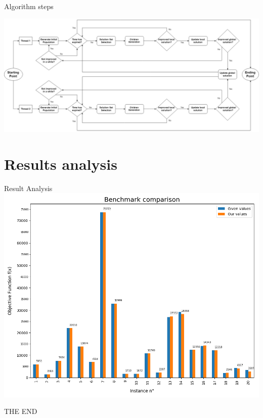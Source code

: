 \documentclass[12pt]{beamer}
\begin{document}
  \begin{frame}[fragile]{Algorithm steps}
    \begin{adjustwidth}{-2em}{-2em}
      \includegraphics[scale=0.21]{res/Algorithm}
    \end{adjustwidth}
  \end{frame}

  \section{Results analysis}
  \begin{frame}[fragile]{Result Analysis}
    \includegraphics[scale=0.4]{res/benchmarkComparison}
  \end{frame}

  \begin{frame}[standout]
  	THE END
  \end{frame}
\end{document}
